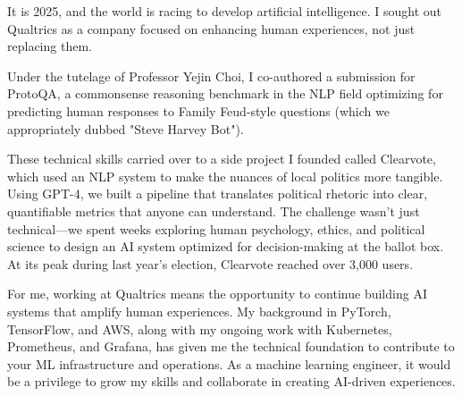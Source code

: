 It is 2025, and the world is racing to develop artificial intelligence. I sought out Qualtrics as a company focused on enhancing human experiences, not just replacing them.

Under the tutelage of Professor Yejin Choi, I co-authored a submission for ProtoQA, a commonsense reasoning benchmark in the NLP field optimizing for predicting human responses to Family Feud-style questions (which we appropriately dubbed "Steve Harvey Bot").

These technical skills carried over to a side project I founded called Clearvote, which used an NLP system to make the nuances of local politics more tangible. Using GPT-4, we built a pipeline that translates political rhetoric into clear, quantifiable metrics that anyone can understand. The challenge wasn't just technical—we spent weeks exploring human psychology, ethics, and political science to design an AI system optimized for decision-making at the ballot box. At its peak during last year’s election, Clearvote reached over 3,000 users.

For me, working at Qualtrics means the opportunity to continue building AI systems that amplify human experiences. My background in PyTorch, TensorFlow, and AWS, along with my ongoing work with Kubernetes, Prometheus, and Grafana, has given me the technical foundation to contribute to your ML infrastructure and operations. As a machine learning engineer, it would be a privilege to grow my skills and collaborate in creating AI-driven experiences.
